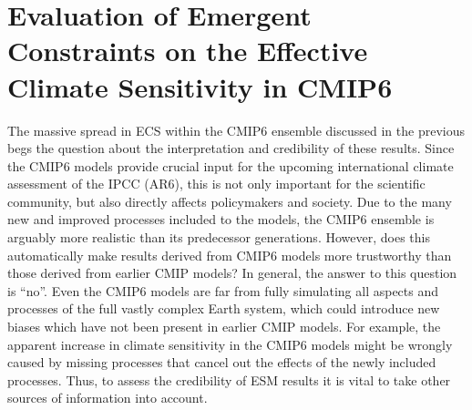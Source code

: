 
%



\chapter{Evaluation of Emergent Constraints on the Effective Climate
  Sensitivity in \acs{CMIP}6}
\label{ch:05:paper_ecs}

The massive spread in \ac{ECS} within the \acs{CMIP}6 ensemble discussed in the
previous  begs the question about the
interpretation and credibility of these results. Since the \acs{CMIP}6 models
provide crucial input for the upcoming international climate assessment of the
\ac{IPCC} (\acs{AR}6), this is not only important for the scientific community,
but also directly affects policymakers and society. Due to the many new and
improved processes included to the models, the \acs{CMIP}6 ensemble is arguably
more realistic than its predecessor generations. However, does this
automatically make results derived from \acs{CMIP}6 models more trustworthy
than those derived from earlier \ac{CMIP} models? In general, the answer to
this question is \enquote{no}. Even the \acs{CMIP}6 models are far from fully
simulating all aspects and processes of the full vastly complex Earth system,
which could introduce new biases which have not been present in earlier
\ac{CMIP} models. For example, the apparent increase in climate sensitivity in
the \acs{CMIP}6 models might be wrongly caused by missing processes that cancel
out the effects of the newly included processes. Thus, to assess the
credibility of \ac{ESM} results it is vital to take other sources of
information into account.

